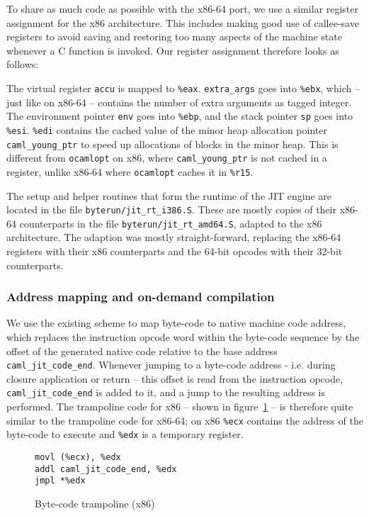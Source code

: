 \documentclass[12pt,a4paper,final]{article}
\begin{document}
To share as much code as possible with the x86-64 port, we use a similar register assignment
for the x86 architecture. This includes making good use of callee-save registers to avoid
saving and restoring too many aspects of the machine state whenever a C function is
invoked. Our register assignment therefore looks as follows:

The virtual register \texttt{accu} is mapped to \texttt{\%eax}.
\texttt{extra\_args} goes into \texttt{\%ebx}, which -- just like on x86-64 -- contains
the number of extra arguments as tagged integer.
The environment pointer \texttt{env} goes into \texttt{\%ebp}, and
the stack pointer \texttt{sp} goes into \texttt{\%esi}.
\texttt{\%edi} contains the cached value of the minor heap allocation pointer
\texttt{caml\_young\_ptr} to speed up allocations of blocks in the minor heap. This
is different from \texttt{ocamlopt} on x86, where \texttt{caml\_young\_ptr} is not
cached in a register, unlike x86-64 where \texttt{ocamlopt} caches it in \texttt{\%r15}.

The setup and helper routines that form the runtime of the JIT engine are located in the
file \texttt{byterun/jit\_rt\_i386.S}. These are mostly copies of their x86-64 counterparts
in the file \texttt{byterun/jit\_rt\_amd64.S}, adapted to the x86 architecture. The
adaption was mostly straight-forward, replacing the x86-64 registers with their x86
counterparts and the 64-bit opcodes with their 32-bit counterparts.

\subsubsection{Address mapping and on-demand compilation}

We use the existing scheme to map byte-code to native machine code address, which
replaces the instruction opcode word within the byte-code sequence by
the offset of the generated native code relative to the base address
\texttt{caml\_jit\_code\_end}. Whenever jumping to a byte-code address - i.e.
during closure application or return -- this offset is read from the instruction
opcode, \texttt{caml\_jit\_code\_end} is added to it, and a jump to the resulting
address is performed. The trampoline code for x86 -- shown in
figure~\ref{figure:Byte_code_trampoline_x86} -- is therefore quite similar to
the trampoline code for x86-64; on x86 \texttt{\%ecx} contains the address of the
byte-code to execute and \texttt{\%edx} is a temporary register.

\begin{figure}[h]
  \centering
  \begin{varwidth}{\linewidth}
  \begin{verbatim}
movl (%ecx), %edx
addl caml_jit_code_end, %edx
jmpl *%edx
\end{verbatim}
  \end{varwidth}
  \caption{Byte-code trampoline (x86)}
  \label{figure:Byte_code_trampoline_x86}
\end{figure}
\end{document}
